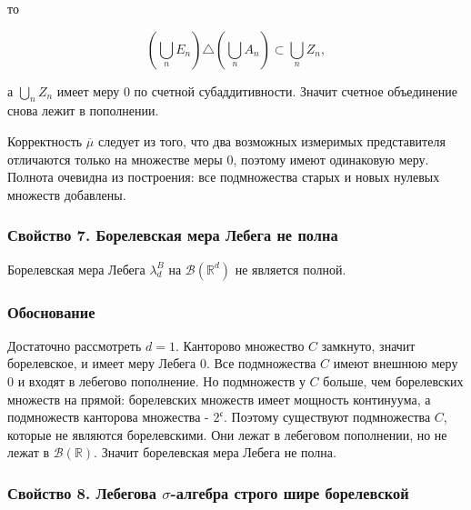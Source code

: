 \documentclass[
  11pt,
  a4paper,
]{article}
\begin{document}
то

\[
\left(\bigcup_n E_n\right)\triangle\left(\bigcup_n A_n\right)
\subset
\bigcup_n Z_n,
\]

а \(\bigcup_n Z_n\) имеет меру \(0\) по счетной субаддитивности. Значит
счетное объединение снова лежит в пополнении.

Корректность \(\overline{\mu}\) следует из того, что два возможных
измеримых представителя отличаются только на множестве меры \(0\),
поэтому имеют одинаковую меру. Полнота очевидна из построения: все
подмножества старых и новых нулевых множеств добавлены.

\subsubsection{Свойство 7. Борелевская мера Лебега не
полна}\label{ux441ux432ux43eux439ux441ux442ux432ux43e-7.-ux431ux43eux440ux435ux43bux435ux432ux441ux43aux430ux44f-ux43cux435ux440ux430-ux43bux435ux431ux435ux433ux430-ux43dux435-ux43fux43eux43bux43dux430}

Борелевская мера Лебега \(\lambda_d^B\) на \(\mathcal B(\mathbb R^d)\)
не является полной.

\subsubsection{Обоснование}\label{ux43eux431ux43eux441ux43dux43eux432ux430ux43dux438ux435}

Достаточно рассмотреть \(d=1\). Канторово множество \(C\) замкнуто,
значит борелевское, и имеет меру Лебега \(0\). Все подмножества \(C\)
имеют внешнюю меру \(0\) и входят в лебегово пополнение. Но подмножеств
у \(C\) больше, чем борелевских множеств на прямой: борелевских множеств
имеет мощность континуума, а подмножеств канторова множества -
\(2^{\mathfrak c}\). Поэтому существуют подмножества \(C\), которые не
являются борелевскими. Они лежат в лебеговом пополнении, но не лежат в
\(\mathcal B(\mathbb R)\). Значит борелевская мера Лебега не полна.

\subsubsection{\texorpdfstring{Свойство 8. Лебегова \(\sigma\)-алгебра
строго шире
борелевской}{Свойство 8. Лебегова \textbackslash sigma-алгебра строго шире борелевской}}\label{ux441ux432ux43eux439ux441ux442ux432ux43e-8.-ux43bux435ux431ux435ux433ux43eux432ux430-sigma-ux430ux43bux433ux435ux431ux440ux430-ux441ux442ux440ux43eux433ux43e-ux448ux438ux440ux435-ux431ux43eux440ux435ux43bux435ux432ux441ux43aux43eux439}
\end{document}
